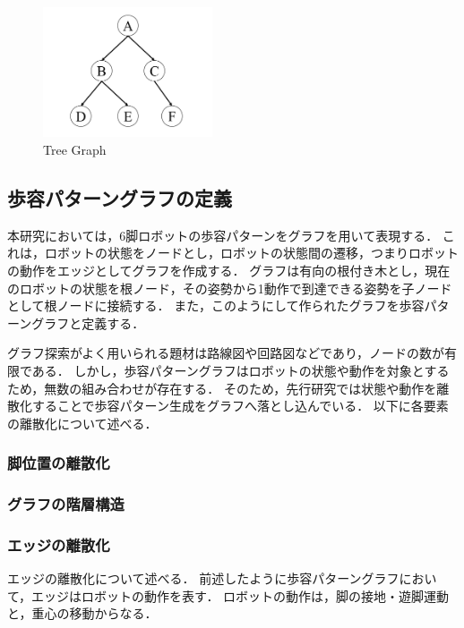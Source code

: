 \begin{figure}[tbp]
  \begin{center}
    \includegraphics[width=50mm, clip]{figure/tree_graph.png}
   \caption{Tree Graph}
   \label{fig:tree_graph}
  \end{center}
\end{figure}

\subsection{歩容パターングラフの定義}
本研究においては，6脚ロボットの歩容パターンをグラフを用いて表現する．
これは，ロボットの状態をノードとし，ロボットの状態間の遷移，つまりロボットの動作をエッジとしてグラフを作成する．
グラフは有向の根付き木とし，現在のロボットの状態を根ノード，その姿勢から1動作で到達できる姿勢を子ノードとして根ノードに接続する．
また，このようにして作られたグラフを歩容パターングラフと定義する．

グラフ探索がよく用いられる題材は路線図や回路図などであり，ノードの数が有限である．
しかし，歩容パターングラフはロボットの状態や動作を対象とするため，無数の組み合わせが存在する．
そのため，先行研究では状態や動作を離散化することで歩容パターン生成をグラフへ落とし込んでいる．
以下に各要素の離散化について述べる．

\subsubsection{脚位置の離散化}

\subsubsection{グラフの階層構造}

\subsubsection{エッジの離散化}
エッジの離散化について述べる．
前述したように歩容パターングラフにおいて，エッジはロボットの動作を表す．
ロボットの動作は，脚の接地・遊脚運動と，重心の移動からなる．

